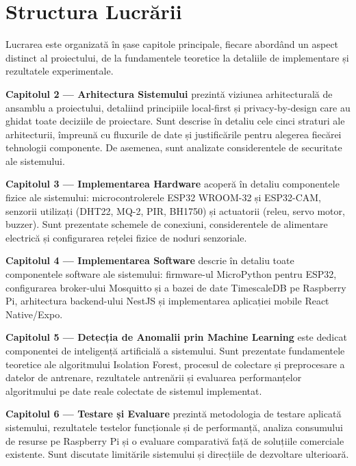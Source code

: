 \documentclass[12pt, twoside, a4paper]{report}
\begin{document}
\section{Structura Lucrării}

Lucrarea este organizată în șase capitole principale, fiecare abordând un aspect
distinct al proiectului, de la fundamentele teoretice la detaliile de implementare și
rezultatele experimentale.

\textbf{Capitolul 2 --- Arhitectura Sistemului} prezintă viziunea arhitecturală de
ansamblu a proiectului, detaliind principiile local-first și privacy-by-design care au
ghidat toate deciziile de proiectare. Sunt descrise în detaliu cele cinci straturi ale
arhitecturii, împreună cu fluxurile de date și justificările pentru alegerea fiecărei
tehnologii componente. De asemenea, sunt analizate considerentele de securitate ale
sistemului.

\textbf{Capitolul 3 --- Implementarea Hardware} acoperă în detaliu componentele
fizice ale sistemului: microcontrolerele ESP32 WROOM-32 și ESP32-CAM, senzorii
utilizați (DHT22, MQ-2, PIR, BH1750) și actuatorii (releu, servo motor, buzzer).
Sunt prezentate schemele de conexiuni, considerentele de alimentare electrică și
configurarea rețelei fizice de noduri senzoriale.

\textbf{Capitolul 4 --- Implementarea Software} descrie în detaliu toate componentele
software ale sistemului: firmware-ul MicroPython pentru ESP32, configurarea broker-ului
Mosquitto și a bazei de date TimescaleDB pe Raspberry Pi, arhitectura backend-ului NestJS
și implementarea aplicației mobile React Native/Expo.

\textbf{Capitolul 5 --- Detecția de Anomalii prin Machine Learning} este dedicat
componentei de inteligență artificială a sistemului. Sunt prezentate fundamentele
teoretice ale algoritmului Isolation Forest, procesul de colectare și preprocesare a
datelor de antrenare, rezultatele antrenării și evaluarea performanțelor algoritmului
pe date reale colectate de sistemul implementat.

\textbf{Capitolul 6 --- Testare și Evaluare} prezintă metodologia de testare aplicată
sistemului, rezultatele testelor funcționale și de performanță, analiza consumului de
resurse pe Raspberry Pi și o evaluare comparativă față de soluțiile comerciale existente.
Sunt discutate limitările sistemului și direcțiile de dezvoltare ulterioară.


\end{document}
